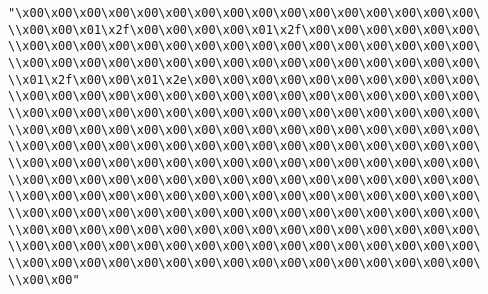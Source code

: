 \verb|"\x00\x00\x00\x00\x00\x00\x00\x00\x00\x00\x00\x00\x00\x00\x00\x00\|\newline
\verb|\\x00\x00\x01\x2f\x00\x00\x00\x00\x01\x2f\x00\x00\x00\x00\x00\x00\|\newline
\verb|\\x00\x00\x00\x00\x00\x00\x00\x00\x00\x00\x00\x00\x00\x00\x00\x00\|\newline
\verb|\\x00\x00\x00\x00\x00\x00\x00\x00\x00\x00\x00\x00\x00\x00\x00\x00\|\newline
\verb|\\x01\x2f\x00\x00\x01\x2e\x00\x00\x00\x00\x00\x00\x00\x00\x00\x00\|\newline
\verb|\\x00\x00\x00\x00\x00\x00\x00\x00\x00\x00\x00\x00\x00\x00\x00\x00\|\newline
\verb|\\x00\x00\x00\x00\x00\x00\x00\x00\x00\x00\x00\x00\x00\x00\x00\x00\|\newline
\verb|\\x00\x00\x00\x00\x00\x00\x00\x00\x00\x00\x00\x00\x00\x00\x00\x00\|\newline
\verb|\\x00\x00\x00\x00\x00\x00\x00\x00\x00\x00\x00\x00\x00\x00\x00\x00\|\newline
\verb|\\x00\x00\x00\x00\x00\x00\x00\x00\x00\x00\x00\x00\x00\x00\x00\x00\|\newline
\verb|\\x00\x00\x00\x00\x00\x00\x00\x00\x00\x00\x00\x00\x00\x00\x00\x00\|\newline
\verb|\\x00\x00\x00\x00\x00\x00\x00\x00\x00\x00\x00\x00\x00\x00\x00\x00\|\newline
\verb|\\x00\x00\x00\x00\x00\x00\x00\x00\x00\x00\x00\x00\x00\x00\x00\x00\|\newline
\verb|\\x00\x00\x00\x00\x00\x00\x00\x00\x00\x00\x00\x00\x00\x00\x00\x00\|\newline
\verb|\\x00\x00\x00\x00\x00\x00\x00\x00\x00\x00\x00\x00\x00\x00\x00\x00\|\newline
\verb|\\x00\x00\x00\x00\x00\x00\x00\x00\x00\x00\x00\x00\x00\x00\x00\x00\|\newline
\verb|\\x00\x00"|\newline
